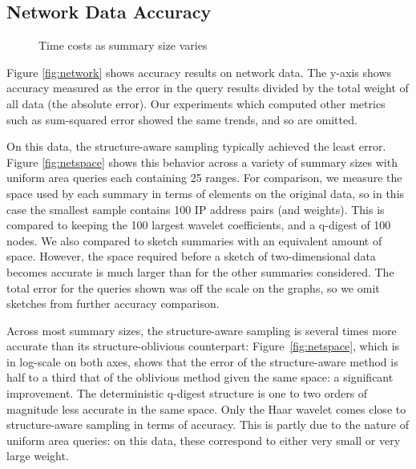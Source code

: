 \documentclass[11pt]{article}
\begin{document}
\subsection{Network Data Accuracy}

\begin{figure*}[t]
\hspace*{-6mm}
\caption{Time costs as summary size varies}
\label{fig:time}
\end{figure*}

Figure \ref{fig:network} shows accuracy results on network data.
The y-axis shows accuracy measured as the error in the query results
divided by the total weight of all data (the absolute error). 
Our experiments which computed other metrics such as 
sum-squared error showed the same trends, and so are omitted. 

On this data, the structure-aware sampling typically achieved the
least error.
Figure \ref{fig:netspace} shows this behavior across a variety of
summary sizes  with uniform area queries each containing 25 ranges.  
For comparison, we measure the space used by each summary in terms of
elements on the original data, so in this case the smallest sample
contains 100 IP address pairs (and weights).
This is compared to keeping the 100 largest wavelet coefficients, and
a q-digest of 100 nodes. 
We also compared to sketch summaries with an equivalent amount of
space. 
However, the space required before a sketch of two-dimensional data
becomes accurate is
much larger than for the other summaries considered. 
The total error for the queries shown was off the scale on the graphs,
so we omit sketches from further accuracy comparison. 

Across most summary sizes, the structure-aware sampling is several
times more accurate than its structure-oblivious counterpart:
 Figure~\ref{fig:netspace}, which is in log-scale on both axes,
shows that the error of the structure-aware method is half to a third
that of the oblivious method given the same space: a significant
improvement.  
The deterministic q-digest structure is one to two orders of magnitude
less accurate in the same space. 
Only the Haar wavelet comes close to structure-aware sampling in terms
of accuracy. 
This is partly due to the nature of uniform area queries:
on this data, these correspond to either very small or very large weight.
\end{document}
